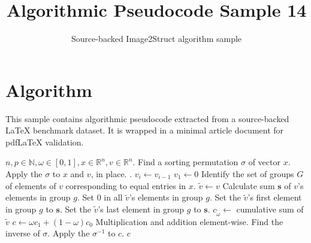 \documentclass[11pt]{article}
\title{Algorithmic Pseudocode Sample 14}
\author{Source-backed Image2Struct algorithm sample}
\date{}
\begin{document}
\maketitle
\section{Algorithm}
This sample contains algorithmic pseudocode extracted from a source-backed LaTeX benchmark dataset. It is wrapped in a minimal article document for pdfLaTeX validation.

\begin{algorithm}[htbp]
\caption{Source-backed algorithmic procedure}
\begin{algorithm}
\caption{Multiplication of indicator matrix of vector $x$ with arbitrary vector $v$}
\begin{algorithmic}[1]
\Require $n,p\in\mathbb N, \omega \in [0,1], x\in\mathbb R^n, v \in\mathbb R^{n}$.
\State Find a sorting permutation $\sigma$ of vector $x$.
\State Apply the $\sigma$ to $x$ and $v$, in place.
.
\State $v_{i} \gets v_{i-1}$
\EndFor
\State $v_{1} \gets 0$
\EndIf
\State Identify the set of groups $G$ of elements of $v$ corresponding to equal entries in $x$.
\State $\tilde v \gets v$
\State Calculate sum $\mathbf s$ of $v$'s elements in group $g$.
\State Set $0$ in all $\tilde v$'s elements in group $g$.
\State Set the $\tilde v$'s first element in group $g$ to $\mathbf s$.
\Else
\State Set the $\tilde v$'s last element in group $g$ to $\mathbf s$.
\EndIf
\EndFor
\State $c_{\tilde \omega} \gets$ cumulative sum of $\tilde v$
\EndFor
\State $c \gets \omega c_1 + (1-\omega)c_0$
\Comment Multiplication and addition element-wise.
\State Find the inverse of $\sigma$.
\State Apply the $\sigma^{-1}$ to $c$.
\State \Return $c$
\end{algorithmic}
\end{algorithm}
\end{algorithm}
\end{document}
